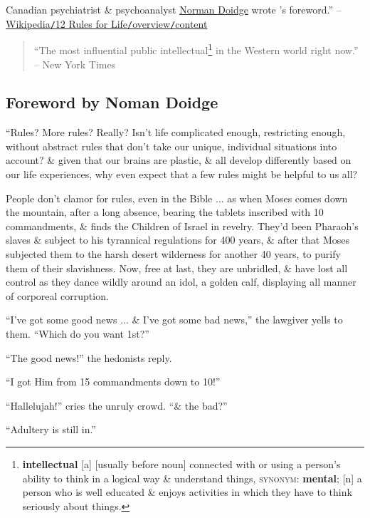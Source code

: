 \documentclass{article}
\begin{document}
Canadian psychiatrist \& psychoanalyst \href{https://en.wikipedia.org/wiki/Norman_Doidge}{Norman Doidge} wrote \cite{Peterson2018}'s foreword.'' -- \href{https://en.wikipedia.org/wiki/12_Rules_for_Life#Content}{Wikipedia{\tt/}12 Rules for Life{\tt/}overview{\tt/}content}

\begin{quotation}
	``The most influential public intellectual\footnote{\textbf{intellectual} [a] [usually before noun] connected with or using a person's ability to think in a logical way \& understand things, \textsc{synonym}: \textbf{mental}; [n] a person who is well educated \& enjoys activities in which they have to think seriously about things.} in the Western world right now.'' -- New York Times
\end{quotation}


\subsection{Foreword by Noman Doidge}
``Rules? More rules? Really? Isn't life complicated enough, restricting enough, without abstract rules that don't take our unique, individual situations into account? \& given that our brains are plastic, \& all develop differently based on our life experiences, why even expect that a few rules might be helpful to us all?

People don't clamor for rules, even in the Bible $\ldots$ as when Moses comes down the mountain, after a long absence, bearing the tablets inscribed with 10 commandments, \& finds the Children of Israel in revelry. They'd been Pharaoh's slaves \& subject to his tyrannical regulations for 400 years, \& after that Moses subjected them to the harsh desert wilderness for another 40 years, to purify them of their slavishness. Now, free at last, they are unbridled, \& have lost all control as they dance wildly around an idol, a golden calf, displaying all manner of corporeal corruption.

``I've got some good news $\ldots$ \& I've got some bad news,'' the lawgiver yells to them. ``Which do you want 1st?''

``The good news!'' the hedonists reply.

``I got Him from 15 commandments down to 10!''

``Hallelujah!'' cries the unruly crowd. ``\& the bad?''

``Adultery is still in.''
\end{document}
